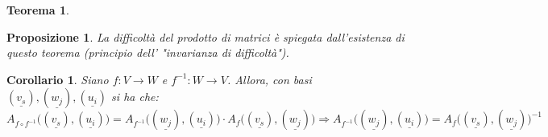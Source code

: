 \documentclass[12pt]{article}
\newenvironment{para}{\begin{adjustwidth}{13mm}{}}{\end{adjustwidth}}
\newtheorem{Corollario}{Corollario}[subsection]
\newtheorem{Teorema}{Teorema}[subsection]
\newtheorem{Proposizione}{Proposizione}[subsection]
\begin{document}
\begin{para}
\begin{Teorema}
\end{Teorema}
\begin{Proposizione}
    La difficoltà del prodotto di matrici è spiegata dall'esistenza di questo teorema (principio dell' "invarianza di difficoltà").
\end{Proposizione}
\begin{Corollario}
    Siano $f:V\rightarrow W$ e $f^{-1}:W \rightarrow V$. Allora, con basi $(\underline{v_s}), (\underline{w_j}), (\underline{u_i})$ si ha che: $$A_{f\circ f^{-1}}\bigl((\underline{v_s}), (\underline{u_i})\bigr) = A_{f^{-1}}\bigl((\underline{w_j}), (\underline{u_i})\bigr) \cdot A_{f}\bigl((\underline{v_s}), (\underline{w_j})\bigr) \Rightarrow A_{ f^{-1}}\bigl((\underline{w_j}), (\underline{u_i})\bigr) = A_{f}\bigl((\underline{v_s}), (\underline{w_j})\bigr)^{-1}$$
\end{Corollario}
\newpage

\end{para}
\end{document}
